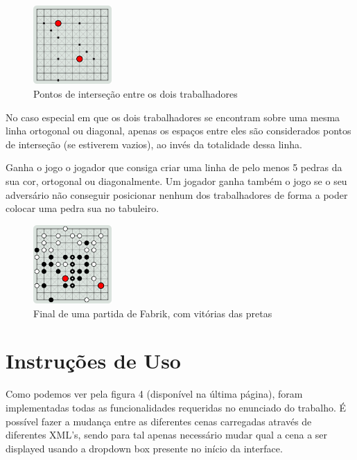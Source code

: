 \documentclass[a4paper]{article}
\begin{document}
\begin{figure}[h!]
\begin{center}
\includegraphics[height=3cm,width=3cm]{images/fabrik_intersection.png}
\caption{Pontos de interseção entre os dois trabalhadores}
\end{center}
\end{figure}

No caso especial em que os dois trabalhadores se encontram sobre uma mesma linha ortogonal ou diagonal, apenas os espaços entre eles são considerados pontos de interseção (se estiverem vazios), ao invés da totalidade dessa linha.

Ganha o jogo o jogador que consiga criar uma linha de pelo menos 5 pedras da sua cor, ortogonal ou diagonalmente. Um jogador ganha também o jogo se o seu adversário não conseguir posicionar nenhum dos trabalhadores de forma a poder colocar uma pedra sua no tabuleiro.

\begin{figure}[h!]
\begin{center}
\includegraphics[height=3cm,width=3cm]{images/fabrik_full_board.png}
\caption{Final de uma partida de Fabrik, com vitórias das pretas}
\end{center}
\end{figure}

\newpage

\section{Instruções de Uso}

Como podemos ver pela figura 4 (disponível na última página), foram implementadas todas as funcionalidades requeridas no enunciado do trabalho. É possível fazer a mudança entre as diferentes cenas carregadas através de diferentes XML’s, sendo para tal apenas necessário mudar qual a cena a ser displayed usando a dropdown box presente no início da interface.
\end{document}

